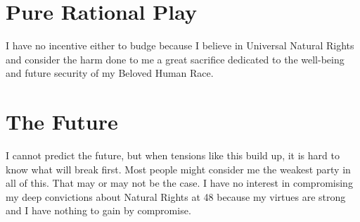 \documentclass{amsart}
\begin{document}
\section{Pure Rational Play}

I have no incentive either to budge because I believe in Universal Natural Rights and consider the harm done to me a great sacrifice dedicated to the well-being and future security of my Beloved Human Race. 

\section{The Future}

I cannot predict the future, but when tensions like this build up, it is hard to know what will break first.  Most people might consider me the weakest party in all of this.  That may or may not be the case.  I have no interest in compromising my deep convictions about Natural Rights at 48 because my virtues are strong and I have nothing to gain by compromise.  
\end{document}
